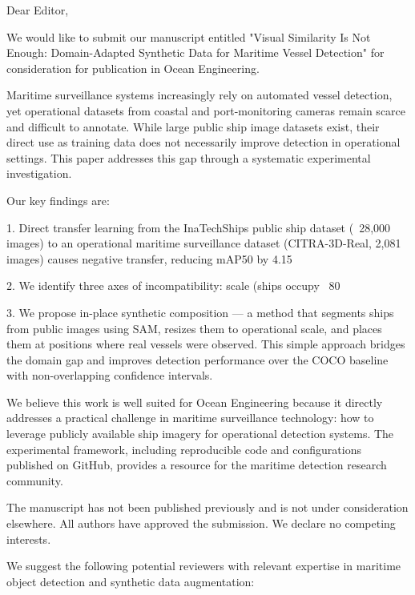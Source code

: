 Dear Editor,

We would like to submit our manuscript entitled "Visual Similarity Is Not Enough: Domain-Adapted Synthetic Data for Maritime Vessel Detection" for consideration for publication in Ocean Engineering.

Maritime surveillance systems increasingly rely on automated vessel detection, yet operational datasets from coastal and port-monitoring cameras remain scarce and difficult to annotate. While large public ship image datasets exist, their direct use as training data does not necessarily improve detection in operational settings. This paper addresses this gap through a systematic experimental investigation.

Our key findings are:

1. Direct transfer learning from the InaTechShips public ship dataset (~28,000 images) to an operational maritime surveillance dataset (CITRA-3D-Real, 2,081 images) causes negative transfer, reducing mAP50 by 4.15%

2. We identify three axes of incompatibility: scale (ships occupy ~80%

3. We propose in-place synthetic composition — a method that segments ships from public images using SAM, resizes them to operational scale, and places them at positions where real vessels were observed. This simple approach bridges the domain gap and improves detection performance over the COCO baseline with non-overlapping confidence intervals.

We believe this work is well suited for Ocean Engineering because it directly addresses a practical challenge in maritime surveillance technology: how to leverage publicly available ship imagery for operational detection systems. The experimental framework, including reproducible code and configurations published on GitHub, provides a resource for the maritime detection research community.

The manuscript has not been published previously and is not under consideration elsewhere. All authors have approved the submission. We declare no competing interests.

We suggest the following potential reviewers with relevant expertise in maritime object detection and synthetic data augmentation:

